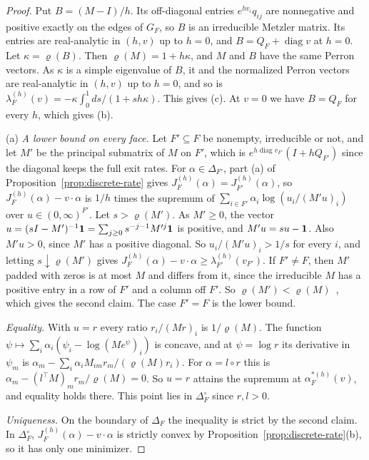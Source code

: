 \begin{proof}
Put $B=(M-I)/h$. Its off-diagonal entries $e^{hv_i}q_{ij}$ are nonnegative and
positive exactly on the edges of $G_F$, so $B$ is an irreducible Metzler matrix.
Its entries are real-analytic in $(h,v)$ up to $h=0$, and $B=Q_F+\operatorname{diag}v$
at $h=0$. Let $\kappa=\varrho(B)$. Then $\varrho(M)=1+h\kappa$, and $M$ and $B$
have the same Perron vectors. As $\kappa$ is a simple eigenvalue of $B$, it and the
normalized Perron vectors are real-analytic in $(h,v)$ up to $h=0$, and so is
$\lambda^{(h)}_F(v)=-\kappa\int_0^1ds/(1+sh\kappa)$. This gives (c). At $v=0$ we
have $B=Q_F$ for every $h$, which gives (b).

(a) \emph{A lower bound on every face.} Let $F'\subseteq F$ be nonempty,
irreducible or not, and let $M'$ be the principal submatrix of $M$ on $F'$, which
is $e^{h\operatorname{diag}v_{F'}}(I+hQ_{F'})$ since the diagonal keeps the full
exit rates. For $\alpha\in\Delta_{F'}$, part (a) of
Proposition~\ref{prop:discrete-rate} gives
$J^{(h)}_F(\alpha)=J^{(h)}_{F'}(\alpha)$, so $J^{(h)}_F(\alpha)-v\cdot\alpha$ is
$1/h$ times the supremum of $\sum_{i\in F'}\alpha_i\log(u_i/(M'u)_i)$ over
$u\in(0,\infty)^{F'}$. Let $s>\varrho(M')$. As $M'\ge0$, the vector
$u=(sI-M')^{-1}\mathbf{1}=\sum_{j\ge0}s^{-j-1}M'^j\mathbf{1}$ is positive, and $M'u=su-\mathbf{1}$.
Also $M'u>0$, since $M'$ has a positive diagonal. So $u_i/(M'u)_i>1/s$ for every
$i$, and letting $s\downarrow\varrho(M')$ gives
$J^{(h)}_F(\alpha)-v\cdot\alpha\ge\lambda^{(h)}_{F'}(v_{F'})$. If $F'\ne F$, then
$M'$ padded with zeros is at most $M$ and differs from it, since the irreducible
$M$ has a positive entry in a row of $F'$ and a column off $F'$. So
$\varrho(M')<\varrho(M)$~\cite[Ch.~2]{bermanplemmons1994}, which gives the second
claim. The case $F'=F$ is the lower bound.

\emph{Equality.} With $u=r$ every ratio $r_i/(Mr)_i$ is $1/\varrho(M)$. The
function $\psi\mapsto\sum_i\alpha_i(\psi_i-\log(Me^\psi)_i)$ is concave, and at
$\psi=\log r$ its derivative in $\psi_m$ is
$\alpha_m-\sum_i\alpha_iM_{im}r_m/(\varrho(M)r_i)$. For $\alpha=l\circ r$ this is
$\alpha_m-(l^\top M)_mr_m/\varrho(M)=0$. So $u=r$ attains the supremum at
$\alpha^{*(h)}_F(v)$, and equality holds there. This point lies in $\Delta_F^\circ$
since $r,l>0$.

\emph{Uniqueness.} On the boundary of $\Delta_F$ the inequality is strict by the
second claim. In $\Delta_F^\circ$, $J^{(h)}_F(\alpha)-v\cdot\alpha$ is strictly
convex by Proposition~\ref{prop:discrete-rate}(b), so it has only one minimizer.
\end{proof}
